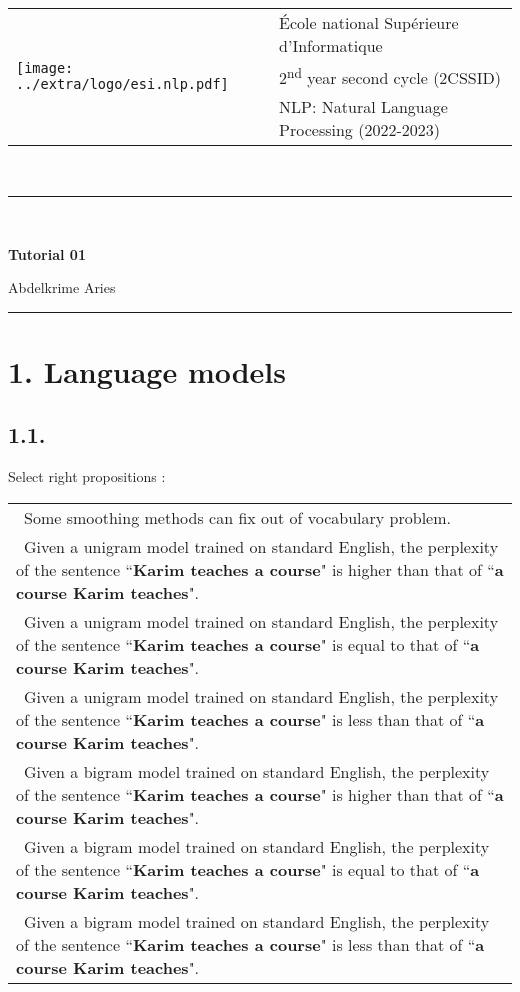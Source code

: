 \documentclass[11pt, a4paper]{article}
\begin{document}

\noindent
\begin{tabular}{ll}
\multirow{3}{*}{\texttt{[image: ../extra/logo/esi.nlp.pdf]}} & 
\'Ecole national Supérieure d'Informatique\\
& 2\textsuperscript{nd} year second cycle (2CSSID)\\
& NLP: Natural Language Processing (2022-2023)
\end{tabular}\\[.25cm]
\noindent\rule{\textwidth}{2pt}\\[-0.5cm]
\begin{center}
{\LARGE \textbf{Tutorial 01}}
\begin{flushright}
	Abdelkrime Aries
\end{flushright}
\end{center}\vspace{-0.5cm}
\noindent\rule{\textwidth}{2pt}

\section*{1. Language models}


\subsection*{1.1.}

Select right propositions :

\begin{longtable}{|p{}|}
	\hline 
	\Square\ Some smoothing methods can fix out of vocabulary problem. \\
	\Square\ Given a unigram model trained on standard English, the perplexity of the sentence ``\textbf{Karim teaches a course}" is higher than that of ``\textbf{a course Karim teaches}". \\
	\Square\ Given a unigram model trained on standard English, the perplexity of the sentence ``\textbf{Karim teaches a course}" is equal to that of ``\textbf{a course Karim teaches}".\\
	\Square\ Given a unigram model trained on standard English, the perplexity of the sentence ``\textbf{Karim teaches a course}" is less than that of ``\textbf{a course Karim teaches}".\\
	\Square\ Given a bigram model trained on standard English, the perplexity of the sentence ``\textbf{Karim teaches a course}" is higher than that of ``\textbf{a course Karim teaches}". \\
	\Square\ Given a bigram model trained on standard English, the perplexity of the sentence ``\textbf{Karim teaches a course}" is equal to that of ``\textbf{a course Karim teaches}".\\
	\Square\ Given a bigram model trained on standard English, the perplexity of the sentence ``\textbf{Karim teaches a course}" is less than that of ``\textbf{a course Karim teaches}".\\
	\hline
\end{longtable}
\end{document}
